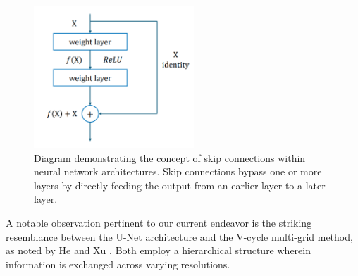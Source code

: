 \begin{figure}[ht]
    \centering
    \includegraphics[width=6cm]{images/Theory-DL/Skip.png}
    \caption{Diagram demonstrating the concept of skip connections within neural network architectures. Skip connections bypass one or more layers by directly feeding the output from an earlier layer to a later layer.} 
    \label{fig:Skip}
\end{figure}
A notable observation pertinent to our current endeavor is the striking resemblance between the U-Net architecture and the V-cycle multi-grid method, as noted by He and Xu \cite{HeXu2019}. Both employ a hierarchical structure wherein information is exchanged across varying resolutions.
